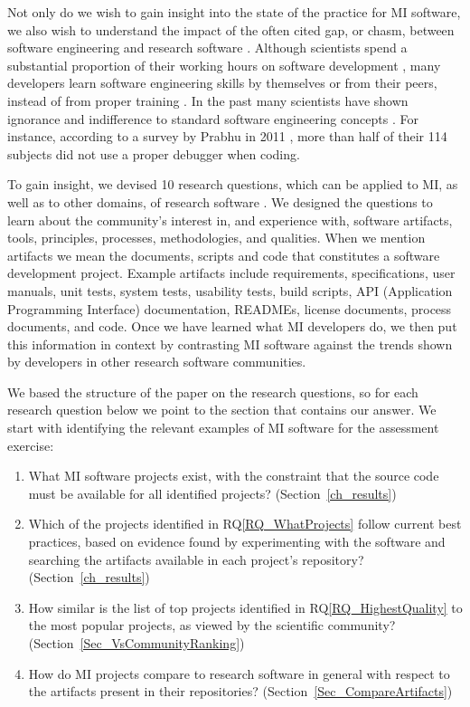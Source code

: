 \documentclass[11pt]{article}
\newcounter{rqnum} %
\newcommand{\rqref}[1]{RQ\ref{#1}}
\newcounter{qnum} %
\begin{document}
Not only do we wish to gain insight into the state of the practice for MI
software, we also wish to understand the impact of the often cited gap, or
chasm, between software engineering and research software \cite{Kelly2007,
Storer2017}. Although scientists spend a substantial proportion of their working
hours on software development \cite{Hannay2009, Prabhu2011}, many developers
learn software engineering skills by themselves or from their peers, instead of
from proper training \cite{Hannay2009}. In the past many scientists have shown
ignorance and indifference to standard software engineering concepts
\cite{Hannay2009}. For instance, according to a survey by Prabhu in 2011
\cite{Prabhu2011}, more than half of their 114 subjects did not use a proper
debugger when coding.

To gain insight, we devised 10 research questions, which can be applied to MI,
as well as to other domains, of research software \cite{SmithEtAl2021,
SmithAndMichalski2022}.  We designed the questions to learn about the
community's interest in, and experience with, software artifacts, tools,
principles, processes, methodologies, and qualities.  When we mention artifacts
we mean the documents, scripts and code that constitutes a software development
project. Example artifacts include requirements, specifications, user manuals,
unit tests, system tests, usability tests, build scripts, API (Application
Programming Interface) documentation, READMEs, license documents, process
documents, and code.  Once we have learned what MI developers do, we then put
this information in context by contrasting MI software against the trends shown
by developers in other research software communities.

We based the structure of the paper on the research questions, so for each
research question below we point to the section that contains our answer.  We
start with identifying the relevant examples of MI software for the assessment
exercise:

\begin{enumerate}
	\item[RQ\refstepcounter{rqnum}\therqnum \label{RQ_WhatProjects}:] What MI
	software projects exist, with the constraint that the source code must be
	available for all identified projects? (Section~\ref{ch_results})
	\item [RQ\refstepcounter{rqnum}\therqnum \label{RQ_HighestQuality}:] Which
	of the projects identified in \rqref{RQ_WhatProjects} follow current best
	practices, based on evidence found by experimenting with the software and
	searching the artifacts available in each project's repository?
	(Section~\ref{ch_results})
	\item [RQ\refstepcounter{rqnum}\therqnum \label{RQ_CompareHQ2Popular}:] How
	similar is the list of top projects identified in \rqref{RQ_HighestQuality}
	to the most popular projects, as viewed by the scientific community?
	(Section~\ref{Sec_VsCommunityRanking})
    \item [RQ\refstepcounter{rqnum}\therqnum \label{RQ_CompareArtifacts}:] How
	do MI projects compare to research software in general with respect to the
	artifacts present in their repositories?
	(Section~\ref{Sec_CompareArtifacts})
\end{enumerate}
\end{document}

